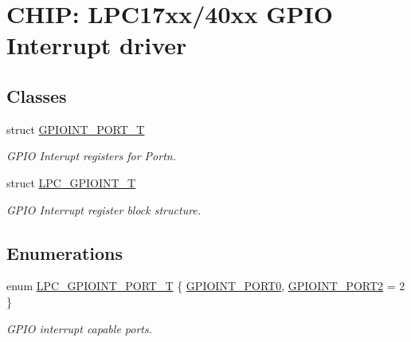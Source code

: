 \hypertarget{group__GPIOINT__17XX__40XX}{}\section{C\+H\+IP\+: L\+P\+C17xx/40xx G\+P\+IO Interrupt driver}
\label{group__GPIOINT__17XX__40XX}
\subsection*{Classes}
\begin{DoxyCompactItemize}
\item 
struct \hyperlink{structGPIOINT__PORT__T}{G\+P\+I\+O\+I\+N\+T\+\_\+\+P\+O\+R\+T\+\_\+T}
\begin{DoxyCompactList}\small\item\em G\+P\+IO Interupt registers for Portn. \end{DoxyCompactList}\item 
struct \hyperlink{structLPC__GPIOINT__T}{L\+P\+C\+\_\+\+G\+P\+I\+O\+I\+N\+T\+\_\+T}
\begin{DoxyCompactList}\small\item\em G\+P\+IO Interrupt register block structure. \end{DoxyCompactList}\end{DoxyCompactItemize}
\subsection*{Enumerations}
\begin{DoxyCompactItemize}
\item 
enum \hyperlink{group__GPIOINT__17XX__40XX_ga41631ac5e33fde341c0afe680ded9fee}{L\+P\+C\+\_\+\+G\+P\+I\+O\+I\+N\+T\+\_\+\+P\+O\+R\+T\+\_\+T} \{ \hyperlink{group__GPIOINT__17XX__40XX_gga41631ac5e33fde341c0afe680ded9feea976b0fb82055c52332950506a6621bba}{G\+P\+I\+O\+I\+N\+T\+\_\+\+P\+O\+R\+T0}, 
\hyperlink{group__GPIOINT__17XX__40XX_gga41631ac5e33fde341c0afe680ded9feeafd8afad46d3e74afccbdd0c806bc3aae}{G\+P\+I\+O\+I\+N\+T\+\_\+\+P\+O\+R\+T2} = 2
 \}\begin{DoxyCompactList}\small\item\em G\+P\+IO interrupt capable ports. \end{DoxyCompactList}
\end{DoxyCompactItemize}

